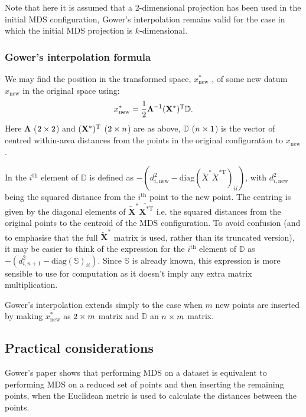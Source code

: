 Note that here it is assumed that a 2-dimensional projection has been used in the initial MDS configuration, Gower's interpolation remains valid for the case in which the initial MDS projection is $k$-dimensional.

\subsubsection{Gower's interpolation formula}

We may find the position in the transformed space, $x^*_{\text{new}}$ , of some new datum $x_{\text{new}}$ in the original space using:
\begin{equation}
x^*_{\text{new}} = \frac{1}{2} \mathbf{\Lambda}^{-1} (\mathbf{X}^*)^{\text{T}} \mathbb{D}.
\label{gower}
\end{equation}
Here $\mathbf{\Lambda}$ ($2 \times 2$) and $(\mathbf{X}^*)^{\text{T}}$ ($2 \times n$) are as above, $\mathbb{D}$ ($n \times 1$) is the vector of centred within-area distances from the points in the original configuration to $x_{\text{new}}$.

In  the $i^\text{th}$ element of $\mathbb{D}$ is defined as $-(d^2_{i,\text{new}}-\text{diag}(\tilde{X}^* \tilde{X}^{*\text{T}})_{ii})$, with $d^2_{i,\text{new}}$ being the squared distance from the $i^\text{th}$ point to the new point. The centring is given by the diagonal elements of $\tilde{\mathbf{X}}^*\tilde{\mathbf{X}^{* \text{T}}}$ i.e. the squared distances from the original points to the centroid of the MDS configuration. To avoid confusion (and to emphasise that the full $\tilde{\mathbf{X}}^*$ matrix is used, rather than its truncated version), it may be easier to think of the expression for the $i^\text{th}$ element of $\mathbb{D}$ as $-(d^2_{i,n+1}-\text{diag}(\mathbb{S})_{ii})$. Since $\mathbb{S}$ is already known, this expression is more sensible to use for computation as it doesn't imply any extra matrix multiplication.

Gower's interpolation extends simply to the case when $m$ new points are inserted by making $x^*_{\text{new}}$ as $2 \times m$ matrix and $\mathbb{D}$ an $n \times m$ matrix.


\subsection{Practical considerations}

Gower's paper shows that performing MDS on a dataset is equivalent to performing MDS on a reduced set of points and then inserting the remaining points, when the Euclidean metric is used to calculate the distances between the points. 

